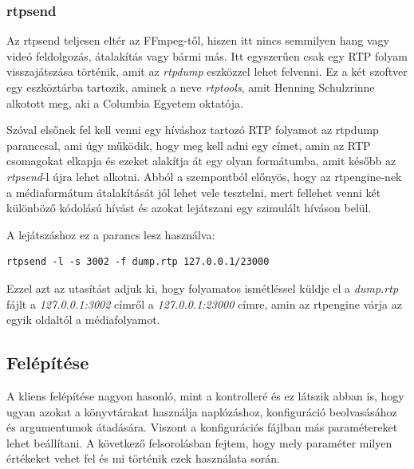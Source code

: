\subsubsection{rtpsend}

Az rtpsend \cite{rtpsend} teljesen eltér az FFmpeg-től, hiszen itt nincs semmilyen hang vagy videó
feldolgozás, átalakítás vagy bármi más. Itt egyszerűen csak egy RTP folyam visszajátszása
történik, amit az \textit{rtpdump} eszközzel lehet felvenni. Ez a két szoftver egy 
eszköztárba tartozik, aminek a neve \textit{rtptools}, amit Henning Schulzrinne
alkotott meg, aki a Columbia Egyetem oktatója.

Szóval elsőnek fel kell venni egy híváshoz tartozó RTP folyamot az rtpdump paranccsal,
ami úgy működik, hogy meg kell adni egy címet, amin az RTP csomagokat elkapja és 
ezeket alakítja át egy olyan formátumba, amit később az \textit{rtpsend}-l újra
lehet alkotni. Abból a szempontból előnyös, hogy az rtpengine-nek a médiaformátum
átalakítását jól lehet vele tesztelni, mert fellehet venni két különböző kódolású
hívást és azokat lejátszani egy szimulált híváson belül.

A lejátszáshoz ez a parancs lesz használva: 

\begin{lstlisting}[caption=RTP folyam generálásda rtpsend segítségével, label=lst:rtpsend]
rtpsend -l -s 3002 -f dump.rtp 127.0.0.1/23000
\end{lstlisting}

Ezzel azt az utasítást adjuk ki, hogy folyamatos ismétléssel küldje el a 
\textit{dump.rtp} fájlt a \textit{127.0.0.1:3002} címről a \textit{127.0.0.1:23000}
címre, amin az rtpengine várja az egyik oldaltól a médiafolyamot.

\subsection{Felépítése}

A kliens felépítése nagyon hasonló, mint a kontrolleré és ez látszik abban is, hogy
ugyan azokat a könyvtárakat használja naplózáshoz, konfiguráció beolvasásához és
argumentumok átadására. Viszont a konfigurációs fájlban más paramétereket lehet 
beállítani. A következő felsorolásban fejtem, hogy mely paraméter milyen értékeket 
vehet fel és mi történik ezek használata során. 

